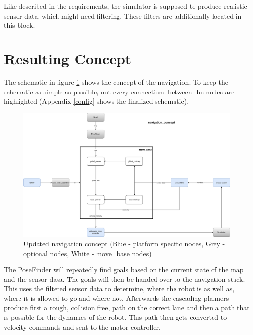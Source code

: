 Like described in the requirements, the simulator is supposed to produce realistic sensor data, which might need filtering. These filters are additionally located in this block.

\section{Resulting Concept}
The schematic in figure \ref{navconcept} shows the concept of the navigation.  To keep the schematic as simple as possible, not every connections between the nodes are highlighted (Appendix \ref{config} shows the finalized schematic).\\

\begin{figure}[H]
	\begin{center}
		\includegraphics[width=140mm]{Pictures/Updated navigation concept}
		\caption[updated navigation concept]{Updated navigation concept (Blue - platform specific nodes, Grey - optional nodes, White - move\_base nodes)}
		\label{navconcept}
	\end{center}
\end{figure}



The PoseFinder will repeatedly find goals based on the current state of the map and the sensor data. The goals will then be handed over to the navigation stack. This uses the filtered sensor data to determine, where the robot is as well as, where it is allowed to go and where not. Afterwards the cascading planners produce first a rough, collision free, path on the correct lane and then a path that is possible for the dynamics of the robot. This path then gets converted to velocity commands and sent to the motor controller.\\




